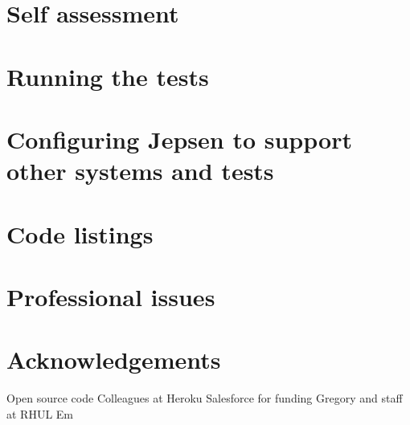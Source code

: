 \documentclass[11pt]{article} %
\theoremstyle{plain}
\theoremstyle{definition}
\begin{document}



\appendix
\section{Self assessment}
\section{Running the tests}
\section{Configuring Jepsen to support other systems and tests}
\section{Code listings}
\section{Professional issues}
\section{Acknowledgements}

Open source code
Colleagues at Heroku
Salesforce for funding
Gregory and staff at RHUL
Em
\end{document}

